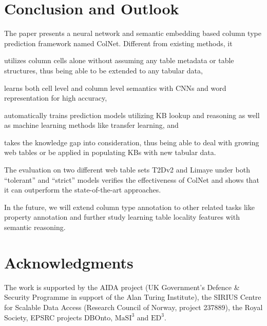 \documentclass[letterpaper]{article}
\newcommand{\rv}[1]{{\color{black}#1}}
\newcommand{\ColNet}{\textsf{ColNet}\xspace}
\begin{document}
\section{Conclusion and Outlook}
The paper presents a neural network and semantic embedding based column type prediction framework named \ColNet.
Different from existing methods,
it 
\begin{inparaenum}[\it (i)]
\item utilizes column cells alone without assuming any table metadata or table structures, \rv{thus being able to be extended to any tabular data},
\item learns both cell level and column level \rv{semantics with CNNs and word representation for high accuracy}, 
\item automatically trains prediction models utilizing KB lookup and reasoning as well as machine learning methods like transfer learning,
and 
\item  takes the knowledge gap into consideration, \rv{thus being able to deal with growing web tables or be applied in populating KBs with new tabular data.}
\end{inparaenum}
The evaluation on two different web table sets T2Dv2 and Limaye under both ``tolerant'' and ``strict'' models
verifies the effectiveness of \ColNet and shows that it can outperform the \rv{state-of-the-art approaches}.

In the future, \rv{
we will extend column type annotation to other related tasks like property annotation
and further study learning table locality features with semantic reasoning.
}

\section{Acknowledgments}


The work is supported by the AIDA project (UK Government's Defence \& Security Programme in support of the Alan Turing Institute), 
the SIRIUS Centre for Scalable Data Access (Research Council of Norway, project 237889),
the Royal Society,
EPSRC projects DBOnto, $\text{MaSI}^{\text{3}}$ and $\text{ED}^{\text{3}}$. 




\end{document}
